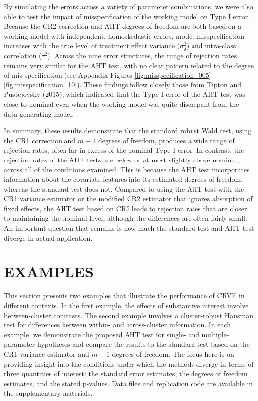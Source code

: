 \documentclass[12pt]{article}
\begin{document}
By simulating the errors across a variety of parameter combinations, we
were also able to test the impact of misspecification of the working
model on Type I error. Because the CR2 correction and AHT degrees of
freedom are both based on a working model with independent,
homoskedastic errors, model misspecification increases with the true
level of treatment effect variance (\(\sigma_\delta^2\)) and intra-class
correlation (\(\tau^2\)). Across the nine error structures, the range of
rejection rates remains very similar for the AHT test, with no clear
pattern related to the degree of mis-specification (see Appendix Figures
\ref{fig:misspecification_005}-\ref{fig:misspecification_10}). These
findings follow closely those from Tipton and Pustejovsky (2015), which
indicated that the Type I error of the AHT test was close to nominal
even when the working model was quite discrepant from the
data-generating model.

In summary, these results demonstrate that the standard robust Wald
test, using the CR1 correction and \(m - 1\) degrees of freedom,
produces a wide range of rejection rates, often far in excess of the
nominal Type I error. In contrast, the rejection rates of the AHT tests
are below or at most slightly above nominal, across all of the
conditions examined. This is because the AHT test incorporates
information about the covariate features into its estimated degrees of
freedom, whereas the standard test does not. Compared to using the AHT
test with the CR1 variance estimator or the modified CR2 estimator that
ignores absorption of fixed effects, the AHT test based on CR2 leads to
rejection rates that are closer to maintaining the nominal level,
although the differences are often fairly small. An important question
that remains is how much the standard test and AHT test diverge in
actual application.

\hypertarget{sec:examples}{%
\section{EXAMPLES}\label{sec:examples}}

This section presents two examples that illustrate the performance of
CRVE in different contexts. In the first example, the effects of
substantive interest involve between-cluster contrasts. The second
example involves a cluster-robust Hausman test for differences between
within- and across-cluster information. In each example, we demonstrate
the proposed AHT test for single- and multiple-parameter hypotheses and
compare the results to the standard test based on the CR1 variance
estimator and \(m - 1\) degrees of freedom. The focus here is on
providing insight into the conditions under which the methods diverge in
terms of three quantities of interest: the standard error estimates, the
degrees of freedom estimates, and the stated p-values. Data files and
replication code are available in the supplementary materials.
\end{document}
